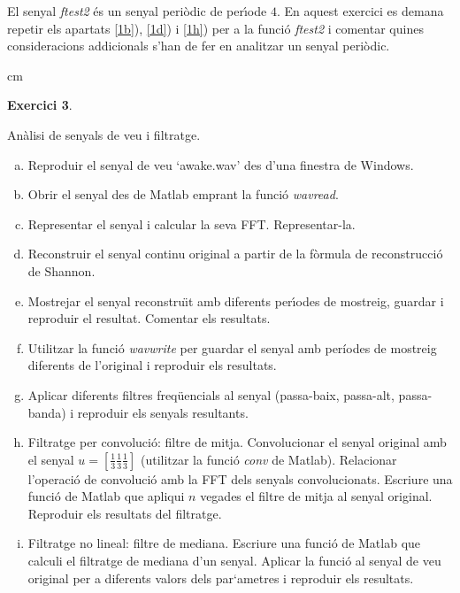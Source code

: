 \documentclass{article}
\begin{document}
El senyal {\it ftest2} \'es un senyal peri\`odic de per\'\i ode
$4$. En aquest exercici es demana repetir els apartats \ref{1b}),
\ref{1d}) i \ref{1h}) per a la funci\'o {\it ftest2} i comentar
quines consideracions addicionals s'han de fer en analitzar un
senyal peri\`odic.

 cm

\noindent \textbf{Exercici 3}. \label{ex3}
\newline

An\`alisi de senyals de veu i filtratge.

\begin{enumerate}[a)]
\item \label{3a} Reproduir el senyal de veu `awake.wav' des d'una
finestra de Windows.

\item \label{3b} Obrir el senyal des de Matlab emprant la funci\'o
{\it wavread}.

\item \label{3c} Representar el senyal i calcular la seva FFT.
Representar-la.

\item \label{3d} Reconstruir el senyal continu original a partir
de la f\`ormula de reconstrucci\'o de Shannon.

\item \label{3e} Mostrejar el senyal reconstru\"\i t amb diferents
per\'\i odes de mostreig, guardar i reproduir el resultat.
Comentar els resultats.

\item \label{3f} Utilitzar la funci\'o {\it wavwrite} per guardar
el senyal amb per\'iodes de mostreig diferents de l'original i
reproduir els resultats.

\item \label{3g} Aplicar diferents filtres freq\"uencials al
senyal (passa-baix, passa-alt, passa-banda) i reproduir els
senyals resultants.

\item \label{3h} Filtratge per convoluci\'o: filtre de mitja.
Convolucionar el senyal original amb el senyal $u=[\frac{1}{3}
\frac{1}{3} \frac{1}{3}]$ (utilitzar la funci\'o {\it conv} de
Matlab). Relacionar l'operaci\'o de convoluci\'o amb la FFT dels
senyals convolucionats. Escriure una funci\'o de Matlab que
apliqui $n$ vegades el filtre de mitja al senyal original.
Reproduir els resultats del filtratge.

\item \label{3i} Filtratge no lineal: filtre de mediana. Escriure
una funci\'o de Matlab que calculi el filtratge de mediana d'un
senyal. Aplicar la funci\'o al senyal de veu original per a
diferents valors dels par`ametres i reproduir els resultats.
\end{enumerate}
\end{document}
